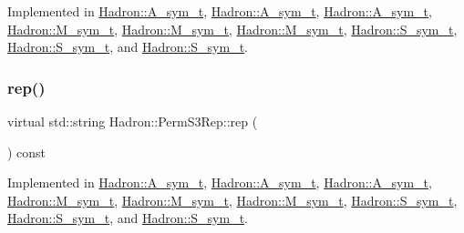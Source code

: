 Implemented in \mbox{\hyperlink{structHadron_1_1A__sym__t_a57e9460ee09050859f969d1f0cae0e92}{Hadron\+::\+A\+\_\+sym\+\_\+t}}, \mbox{\hyperlink{structHadron_1_1A__sym__t_a57e9460ee09050859f969d1f0cae0e92}{Hadron\+::\+A\+\_\+sym\+\_\+t}}, \mbox{\hyperlink{structHadron_1_1A__sym__t_a57e9460ee09050859f969d1f0cae0e92}{Hadron\+::\+A\+\_\+sym\+\_\+t}}, \mbox{\hyperlink{structHadron_1_1M__sym__t_a9ee8ba6fd6c2220231052690b2995ed5}{Hadron\+::\+M\+\_\+sym\+\_\+t}}, \mbox{\hyperlink{structHadron_1_1M__sym__t_a9ee8ba6fd6c2220231052690b2995ed5}{Hadron\+::\+M\+\_\+sym\+\_\+t}}, \mbox{\hyperlink{structHadron_1_1M__sym__t_a9ee8ba6fd6c2220231052690b2995ed5}{Hadron\+::\+M\+\_\+sym\+\_\+t}}, \mbox{\hyperlink{structHadron_1_1S__sym__t_ae8b1558dc91f46f5d78de03f1e587dc0}{Hadron\+::\+S\+\_\+sym\+\_\+t}}, \mbox{\hyperlink{structHadron_1_1S__sym__t_ae8b1558dc91f46f5d78de03f1e587dc0}{Hadron\+::\+S\+\_\+sym\+\_\+t}}, and \mbox{\hyperlink{structHadron_1_1S__sym__t_ae8b1558dc91f46f5d78de03f1e587dc0}{Hadron\+::\+S\+\_\+sym\+\_\+t}}.

\mbox{\label{structHadron_1_1PermS3Rep_a4f22ded21fbb16c6b7dc3d729090ef4f}} 
\subsubsection{\texorpdfstring{rep()}{rep()}\hspace{0.1cm}{\footnotesize\ttfamily [1/2]}}
{\footnotesize\ttfamily virtual std\+::string Hadron\+::\+Perm\+S3\+Rep\+::rep (\begin{DoxyParamCaption}{ }\end{DoxyParamCaption}) const\hspace{0.3cm}{\ttfamily [pure virtual]}}



Implemented in \mbox{\hyperlink{structHadron_1_1A__sym__t_ac60fe125eeb713995aafa4712e23f919}{Hadron\+::\+A\+\_\+sym\+\_\+t}}, \mbox{\hyperlink{structHadron_1_1A__sym__t_ac60fe125eeb713995aafa4712e23f919}{Hadron\+::\+A\+\_\+sym\+\_\+t}}, \mbox{\hyperlink{structHadron_1_1A__sym__t_ac60fe125eeb713995aafa4712e23f919}{Hadron\+::\+A\+\_\+sym\+\_\+t}}, \mbox{\hyperlink{structHadron_1_1M__sym__t_ad90bc816709bb65ec3e0b804090fbefe}{Hadron\+::\+M\+\_\+sym\+\_\+t}}, \mbox{\hyperlink{structHadron_1_1M__sym__t_ad90bc816709bb65ec3e0b804090fbefe}{Hadron\+::\+M\+\_\+sym\+\_\+t}}, \mbox{\hyperlink{structHadron_1_1M__sym__t_ad90bc816709bb65ec3e0b804090fbefe}{Hadron\+::\+M\+\_\+sym\+\_\+t}}, \mbox{\hyperlink{structHadron_1_1S__sym__t_a1a8ccb60f6d70c9a00b8683ad8eac195}{Hadron\+::\+S\+\_\+sym\+\_\+t}}, \mbox{\hyperlink{structHadron_1_1S__sym__t_a1a8ccb60f6d70c9a00b8683ad8eac195}{Hadron\+::\+S\+\_\+sym\+\_\+t}}, and \mbox{\hyperlink{structHadron_1_1S__sym__t_a1a8ccb60f6d70c9a00b8683ad8eac195}{Hadron\+::\+S\+\_\+sym\+\_\+t}}.

